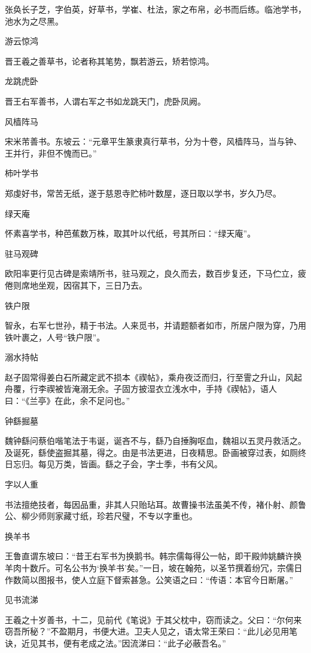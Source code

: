 \documentclass[a4paper,12pt,UTF8,twoside]{ctexbook}
\begin{document}
    张奂长子芝，字伯英，好草书，学崔、杜法，家之布帛，必书而后练。临池学书，池水为之尽黑。
    
    游云惊鸿
    
    晋王羲之善草书，论者称其笔势，飘若游云，矫若惊鸿。
    
    龙跳虎卧
    
    晋王右军善书，人谓右军之书如龙跳天门，虎卧凤阙。
    
    风樯阵马
    
    宋米芾善书。东坡云：“元章平生篆隶真行草书，分为十卷，风樯阵马，当与钟、王并行，非但不愧而已。”
    
    柿叶学书
    
    郑虔好书，常苦无纸，遂于慈恩寺贮柿叶数屋，逐日取以学书，岁久乃尽。
    
    绿天庵
    
    怀素喜学书，种芭蕉数万株，取其叶以代纸，号其所曰：“绿天庵”。
    
    驻马观碑
    
    欧阳率更行见古碑是索靖所书，驻马观之，良久而去，数百步复还，下马伫立，疲倦则席地坐观，因宿其下，三日乃去。
    
    铁户限
    
    智永，右军七世孙，精于书法。人来觅书，并请题额者如市，所居户限为穿，乃用铁叶裹之，人号“铁户限”。
    
    溺水持帖
    
    赵子固常得姜白石所藏定武不损本《禊帖》，乘舟夜泛而归，行至霅之升山，风起舟覆，行李禊被皆淹溺无余。子固方披湿衣立浅水中，手持《禊帖》，语人曰：“《兰亭》在此，余不足问也。”
    
    钟繇掘墓
    
    魏钟繇问蔡伯喈笔法于韦诞，诞吝不与，繇乃自捶胸呕血，魏祖以五灵丹救活之。及诞死，繇使盗掘其墓，得之。由是书法更进，日夜精思。卧画被穿过表，如厕终日忘归。每见万类，皆画。繇之子会，字士季，书有父风。
    
    字以人重
    
    书法擅绝技者，每因品重，非其人只贻玷耳。故曹操书法虽美不传，褚仆射、颜鲁公、柳少师则家藏寸纸，珍若尺璧，不专以字重也。
    
    换羊书
    
    王鲁直谓东坡曰：“昔王右军书为换鹅书。韩宗儒每得公一帖，即干殿帅姚麟许换羊肉十数斤。可名公书为‘换羊书’矣。”一日，坡在翰苑，以圣节撰着纷冗，宗儒日作数简以图报书，使人立庭下督索甚急。公笑语之曰：“传语：本官今日断屠。”
    
    见书流涕
    
    王羲之十岁善书，十二，见前代《笔说》于其父枕中，窃而读之。父曰：“尔何来窃吾所秘？”不盈期月，书便大进。卫夫人见之，语太常王荣曰：“此儿必见用笔诀，近见其书，便有老成之法。”因流涕曰：“此子必蔽吾名。”
    
\end{document}
